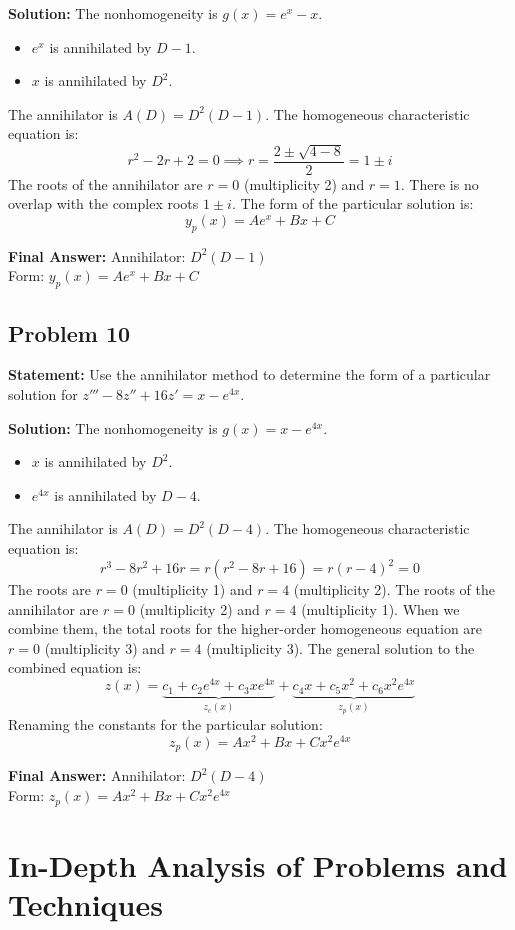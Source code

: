 \documentclass[11pt, a4paper]{article}
\theoremstyle{definition}
\theoremstyle{remark}
\begin{document}
\textbf{Solution:}
The nonhomogeneity is $g(x) = e^x - x$.
\begin{itemize}
    \item $e^x$ is annihilated by $D-1$.
    \item $x$ is annihilated by $D^2$.
\end{itemize}
The annihilator is $A(D) = D^2(D-1)$.
The homogeneous characteristic equation is:
\[
r^2 - 2r + 2 = 0 \implies r = \frac{2 \pm \sqrt{4 - 8}}{2} = 1 \pm i
\]
The roots of the annihilator are $r = 0$ (multiplicity 2) and $r = 1$. There is no overlap with the complex roots $1 \pm i$.
The form of the particular solution is:
\[
y_p(x) = A e^x + Bx + C
\]

\textbf{Final Answer:} 
Annihilator: $D^2(D-1)$ \\
Form: $y_p(x) = A e^x + Bx + C$

\vspace{1em}
\subsection*{Problem 10}
\textbf{Statement:} Use the annihilator method to determine the form of a particular solution for $z''' - 8z'' + 16z' = x - e^{4x}$.

\textbf{Solution:}
The nonhomogeneity is $g(x) = x - e^{4x}$.
\begin{itemize}
    \item $x$ is annihilated by $D^2$.
    \item $e^{4x}$ is annihilated by $D-4$.
\end{itemize}
The annihilator is $A(D) = D^2(D-4)$.
The homogeneous characteristic equation is:
\[
r^3 - 8r^2 + 16r = r(r^2 - 8r + 16) = r(r-4)^2 = 0
\]
The roots are $r = 0$ (multiplicity 1) and $r = 4$ (multiplicity 2).
The roots of the annihilator are $r = 0$ (multiplicity 2) and $r = 4$ (multiplicity 1).
When we combine them, the total roots for the higher-order homogeneous equation are $r = 0$ (multiplicity 3) and $r = 4$ (multiplicity 3).
The general solution to the combined equation is:
\[
z(x) = \underbrace{c_1 + c_2 e^{4x} + c_3 x e^{4x}}_{z_c(x)} + \underbrace{c_4 x + c_5 x^2 + c_6 x^2 e^{4x}}_{z_p(x)}
\]
Renaming the constants for the particular solution:
\[
z_p(x) = Ax^2 + Bx + C x^2 e^{4x}
\]

\textbf{Final Answer:} 
Annihilator: $D^2(D-4)$ \\
Form: $z_p(x) = Ax^2 + Bx + C x^2 e^{4x}$

\newpage
\section{In-Depth Analysis of Problems and Techniques}
\end{document}
